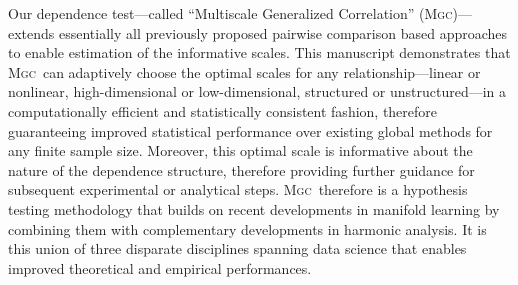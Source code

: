 \documentclass[11pt]{article}
\providecommand{\sct}[1]{{\normalfont\textsc{#1}}}
\newcommand{\Mgc}{\sct{Mgc}}
\newcommand{\Dcorr}{\sct{Dcorr}}
\begin{document}
Our  dependence test---called ``Multiscale Generalized Correlation'' (\Mgc)---extends essentially all previously proposed pairwise comparison based approaches to enable estimation of the  informative scales.  
% 
This manuscript demonstrates that \Mgc~can adaptively choose the optimal scales for any relationship---linear or nonlinear, high-dimensional or low-dimensional, structured or unstructured---in a computationally efficient and statistically consistent fashion, therefore guaranteeing improved statistical performance over existing global methods for any finite sample size. Moreover, this optimal scale is  informative about the nature of the dependence structure, therefore providing further guidance for subsequent experimental or analytical steps. \Mgc~therefore is a hypothesis testing methodology that builds on recent developments in manifold learning by combining them with complementary developments in harmonic analysis.  It is this union of three disparate disciplines spanning data science that enables improved theoretical and empirical performances.  
\end{document}
